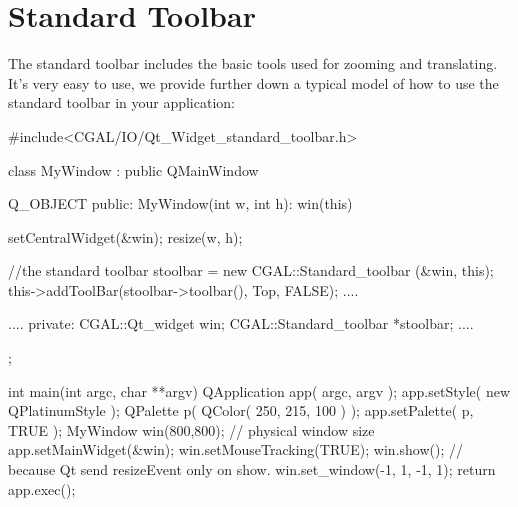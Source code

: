 \section{Standard Toolbar}
\label{Qt_widget_standard_toolbar}

The standard toolbar includes the basic tools used for zooming and translating.
It's very easy to use, we provide further down a typical model of how to use 
the standard toolbar in your application:

\begin{ccExampleCode}
#include<CGAL/IO/Qt_Widget_standard_toolbar.h>

class MyWindow : public QMainWindow
{
  Q_OBJECT
public:
  MyWindow(int w, int h): win(this) {
    setCentralWidget(&win);
    resize(w, h);
    
    //the standard toolbar
    stoolbar = new CGAL::Standard_toolbar (&win, this);
    this->addToolBar(stoolbar->toolbar(), Top, FALSE);
   ....
  }
  ....
private:
  CGAL::Qt_widget	  win;
  CGAL::Standard_toolbar  *stoolbar;
  ....
};

int
main(int argc, char **argv)
{
  QApplication app( argc, argv );
    app.setStyle( new QPlatinumStyle );
    QPalette p( QColor( 250, 215, 100 ) );
    app.setPalette( p, TRUE );
  MyWindow win(800,800); // physical window size
  app.setMainWidget(&win);
  win.setMouseTracking(TRUE);
  win.show();
  // because Qt send resizeEvent only on show.
  win.set_window(-1, 1, -1, 1);
  return app.exec();
}
\end{ccExampleCode}










